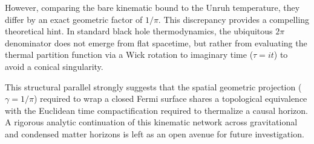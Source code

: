 \documentclass[11pt,a4paper]{article}
\begin{document}
However, comparing the bare kinematic bound to the Unruh temperature, they differ by an exact geometric factor of $1/\pi$. This discrepancy provides a compelling theoretical hint. In standard black hole thermodynamics, the ubiquitous $2\pi$ denominator does not emerge from flat spacetime, but rather from evaluating the thermal partition function via a Wick rotation to imaginary time ($\tau = i t$) to avoid a conical singularity.

This structural parallel strongly suggests that the spatial geometric projection ($\gamma = 1/\pi$) required to wrap a closed Fermi surface shares a topological equivalence with the Euclidean time compactification required to thermalize a causal horizon. A rigorous analytic continuation of this kinematic network across gravitational and condensed matter horizons is left as an open avenue for future investigation.




\end{document}
